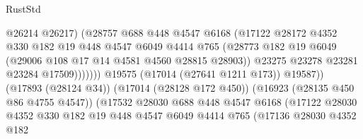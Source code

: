 \begin{lexlean}{RustStd}
\begin{coremodule}
{\begin{coremodule}
{{{{{{{{{{{{{{{{{{{{{{{{{{{{{{{{{{{{{{{{{{{{{{{{{{{{{{{                                            @26214
                                            @26217)
                                          (@28757
                                            @688
                                            @448
                                            @4547
                                            @6168
                                            (@17122
                                              @28172
                                              @4352
                                              @330
                                              @182
                                              @19
                                              @448
                                              @4547
                                              @6049
                                              @4414
                                              @765
                                              (@28773
                                                @182
                                                @19
                                                @6049
                                                (@29006 @108 @17 @14 @4581 @4560 @28815 @28903))
                                              @23275
                                              @23278
                                              @23281
                                              @23284
                                              @17509)))))))
                                @19575
                                (@17014 (@27641 @1211 @173))
                                @19587))
                            (@17893 (@28124 @34))
                            (@17014 (@28128 @172 @450))
                            (@16923 (@28135 @450 @86 @4755 @4547))
                            (@17532
                              @28030
                              @688
                              @448
                              @4547
                              @6168
                              (@17122
                                @28030
                                @4352
                                @330
                                @182
                                @19
                                @448
                                @4547
                                @6049
                                @4414
                                @765
                                (@17136
                                  @28030
                                  @4352
                                  @182
}}}}}}}}}}}}}}}}}}}}}}}}}}}}}}}}}}}}}}}}}}}}}}}}}}}}}}}
\end{coremodule}}
\end{coremodule}
\end{lexlean}
